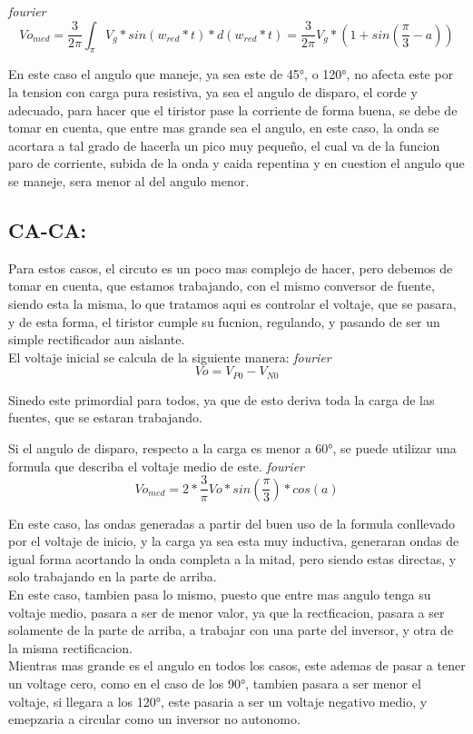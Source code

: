 \documentclass[12pt,a4paper]{article}
\begin{document}
\emph{fourier}
$$ Vo_{med}= \frac{3}{2\pi} \int_\pi V_{g}* sin(w_{red}* t)* d(w_{red}* t)= \frac{3}{2\pi} V_{g}* (1+ sin(\frac{\pi}{3}-a)) $$

En este caso el angulo que maneje, ya sea este de 45°, o 120°, no afecta este por la tension con carga pura resistiva, ya sea el angulo de disparo, el corde y adecuado, para hacer que el tiristor pase la corriente de forma buena, se debe de tomar en cuenta, que entre mas grande sea el angulo, en este caso, la onda se acortara a tal grado de hacerla un pico muy pequeño, el cual va de la funcion paro de corriente, subida de la onda y caida repentina y en cuestion el angulo que se maneje, sera menor al del angulo menor.

\subsection{CA-CA:}

Para estos casos, el circuto es un poco mas complejo de hacer, pero debemos de tomar en cuenta, que estamos trabajando, con el mismo conversor de fuente, siendo esta la misma, lo que tratamos aqui es controlar el voltaje, que se pasara, y de esta forma, el tiristor cumple su fucnion, regulando, y pasando de ser un simple rectificador  aun aislante.\\

El voltaje inicial se calcula de la siguiente manera:
\emph{fourier}
$$ Vo= V_{P0}- V_{N0} $$

Sinedo este primordial para todos, ya que de esto deriva toda la carga de las fuentes, que se estaran trabajando.

Si el angulo de disparo, respecto a la carga es menor a 60°, se puede utilizar una formula que describa el voltaje medio de este.
\emph{fourier}
$$ Vo_{med}= 2* \frac{3}{\pi}Vo* sin(\frac{\pi}{3})* cos(a) $$

En este caso, las ondas generadas a partir del buen uso de la formula conllevado por el voltaje de inicio, y la carga ya sea esta muy inductiva, generaran ondas de igual forma acortando la onda completa a la mitad, pero siendo estas directas, y solo trabajando en la parte de arriba.\\
En este caso, tambien pasa lo mismo, puesto que entre mas angulo tenga su voltaje medio, pasara a ser de menor valor, ya que la rectficacion, pasara a ser solamente de la parte de arriba, a trabajar con una parte del inversor, y otra de la misma rectificacion.\\
Mientras mas grande es el angulo en todos los casos, este ademas de pasar a tener un voltage cero, como en el caso de los 90°, tambien pasara a ser menor el voltaje, si llegara a los 120°, este pasaria a ser un voltaje negativo medio, y emepzaria a circular como un inversor no autonomo.\\
\end{document}
